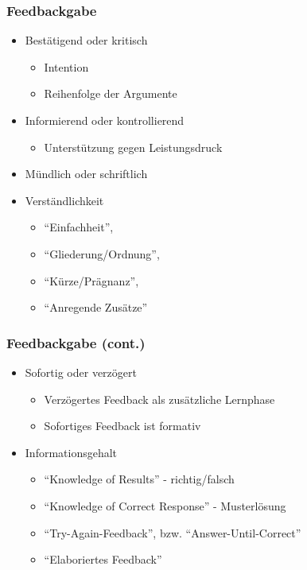 \begin{frame}
	\frametitle{Feedbackgabe}
	\begin{itemize}
		\item Bestätigend oder kritisch 
		\begin{itemize}
			\item Intention
			\item Reihenfolge der Argumente
		\end{itemize}
		\item<2-> Informierend oder kontrollierend
		\begin{itemize}
			\item Unterstützung gegen Leistungsdruck
		\end{itemize}
		\item<3-> Mündlich oder schriftlich
		\item<4-> Verständlichkeit
		\begin{itemize}
			\item ``Einfachheit'',
			\item ``Gliederung/Ordnung'',
			\item ``Kürze/Prägnanz'',
			\item ``Anregende Zusätze''
		\end{itemize}
	\end{itemize}
\end{frame}

\begin{frame}[<+->]
	\frametitle{Feedbackgabe (cont.)}
	\begin{itemize}
		\item Sofortig oder verzögert
		\begin{itemize}
			\item Verzögertes Feedback als zusätzliche Lernphase
			\item Sofortiges Feedback ist formativ
		\end{itemize}
		\item Informationsgehalt
		\begin{itemize}
			\item ``Knowledge of Results'' - richtig/falsch
			\item ``Knowledge of Correct Response'' - Musterlösung
			\item ``Try-Again-Feedback'', bzw. ``Answer-Until-Correct''
			\item ``Elaboriertes Feedback''
		\end{itemize}
	\end{itemize}
\end{frame}

